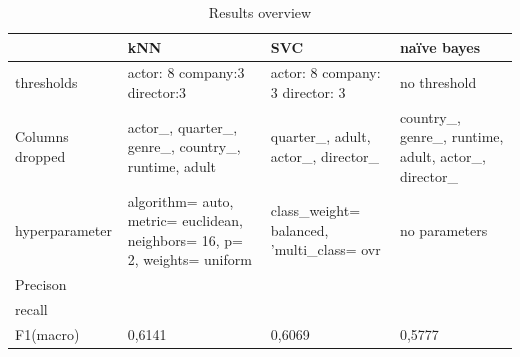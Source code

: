 
\begin{center}
\begin{table}
	\begin{tabular}{ | p{} | p{} | p{2.5cm} | p{3cm}|}
    \hline
    & kNN & SVC & na\"{i}ve bayes\\ \hline
	thresholds & actor: 8 company:3 director:3 & actor: 8 company: 3 director: 3 & no threshold \\  \hline
    Columns dropped & actor\_, quarter\_, genre\_, country\_, runtime, adult & quarter\_, adult, actor\_, director\_ & country\_, genre\_, runtime, adult, actor\_, director\_  \\ \hline
    hyperparameter & algorithm= auto, metric= euclidean, neighbors= 16, p= 2, weights= uniform & class\_weight= balanced, 'multi\_class= ovr & no parameters  \\ \hline
    Precison&  &  &  \\ \hline
	recall &  &  &   \\ \hline
	F1(macro) & 0,6141 & 0,6069 & 0,5777 \\ \hline
    
    \end{tabular}
    \caption{Results overview} 
   \label{tab:values}
\end{table}
\end{center}
